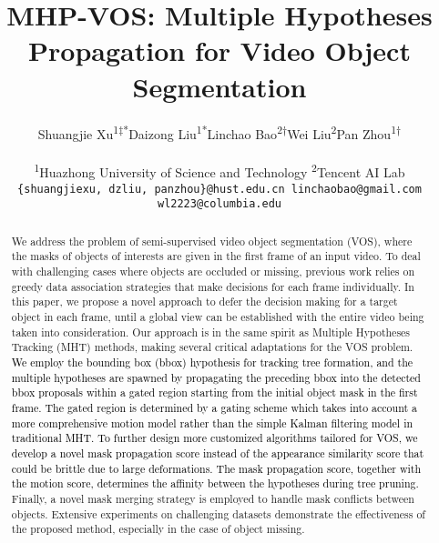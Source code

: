 \documentclass[10pt,twocolumn,letterpaper]{article}
\newcommand{\ldz}[1]{\textcolor{black}{#1}}
\begin{document}
\title{MHP-VOS: Multiple Hypotheses Propagation for Video Object Segmentation}

\author{
	\begin{tabular}{ p{2.8cm}<{\centering} p{2.8cm}<{\centering} p{2.8cm}<{\centering}p{2.8cm}<{\centering} p{2.8cm}<{\centering}}
Shuangjie Xu\textsuperscript{1$\ddagger$*} & Daizong Liu\textsuperscript{1*}  & Linchao Bao\textsuperscript{2$\dagger$} & Wei Liu\textsuperscript{2} & Pan Zhou\textsuperscript{1$\dagger$}
\end{tabular}\\
\textsuperscript{1}Huazhong University of Science and Technology  \quad  \textsuperscript{2}Tencent AI Lab\\
{\tt\small \{shuangjiexu, dzliu, panzhou\}@hust.edu.cn  \quad  linchaobao@gmail.com \quad  wl2223@columbia.edu}\\
}


\maketitle
\thispagestyle{empty}

\begin{abstract}
\vspace{-4pt}
We address the problem of semi-supervised video object segmentation (VOS), where the masks of objects of interests are given in the first frame of an input video.
To deal with challenging cases where objects are occluded or missing, previous work relies on greedy data association strategies that make decisions for each frame individually.
In this paper, we propose a novel approach to defer the decision making for a target object in each frame, until a global view can be established with the entire video being taken into consideration. 
Our approach is in the same spirit as Multiple Hypotheses Tracking (MHT) methods, making several critical adaptations for the VOS problem.
\ldz{
We employ the bounding box (bbox) hypothesis for tracking tree formation,
and the multiple hypotheses are spawned by propagating the preceding bbox into the detected bbox proposals within a gated region starting from the initial object mask in the first frame.
The gated region is determined by a gating scheme which takes into account a more comprehensive motion model rather than the simple Kalman filtering model in traditional MHT.
To further design more customized algorithms tailored for VOS, we develop a novel mask propagation score instead of the appearance similarity score that could be brittle due to large deformations. The mask propagation score, together with the motion score,  determines the affinity between the hypotheses during tree pruning.
}
Finally, a novel mask merging strategy is employed to handle mask conflicts between objects. 
Extensive experiments on challenging datasets demonstrate the effectiveness of the proposed method, especially in the case of object missing.
\vspace{-10pt}
\end{abstract}
\end{document}
